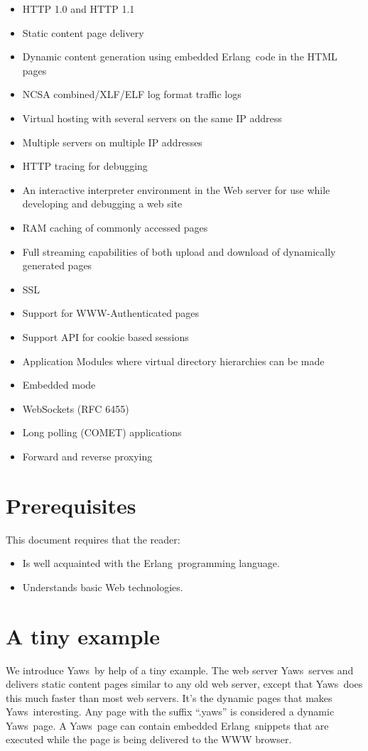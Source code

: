 \documentclass[11pt,oneside,english]{book}
\newcommand{\Erlang}            %
        {{\sc Erlang}}
\newcommand{\Yaws}            %
        {{\sc Yaws}}
\begin{document}
\begin{itemize}
\item HTTP 1.0 and HTTP 1.1
\item Static content page delivery
\item Dynamic content generation using embedded \Erlang\  code in the
HTML pages
\item NCSA combined/XLF/ELF log format traffic logs
\item Virtual hosting with several servers on the same IP address
\item Multiple servers on multiple IP addresses
\item HTTP tracing for debugging
\item An interactive interpreter environment in the Web server for use while
developing and debugging a web site
\item RAM caching of commonly accessed pages
\item Full streaming capabilities of both upload and download of dynamically
generated pages
\item SSL
\item Support for WWW-Authenticated pages
\item Support API for cookie based sessions
\item Application Modules where virtual directory hierarchies can
be made
\item Embedded mode
\item WebSockets (RFC 6455)
\item Long polling (COMET) applications
\item Forward and reverse proxying
\end{itemize}

\section{Prerequisites}
This document requires that the reader:
\begin{itemize}
\item Is well acquainted with the \Erlang\  programming language.
\item Understands basic Web technologies.
\end{itemize}


\section{A tiny example}

We introduce \Yaws\  by help of a tiny example.
 The web server \Yaws\  serves  and delivers
static content pages similar to any old web server, except that \Yaws\  does this
much faster than most web servers. It's the dynamic pages
that makes \Yaws\  interesting. Any page with the suffix ``.yaws'' is considered
a dynamic \Yaws\  page. A \Yaws\  page can contain embedded \Erlang\  snippets that
are executed while the page is being delivered to the WWW browser.
\end{document}
